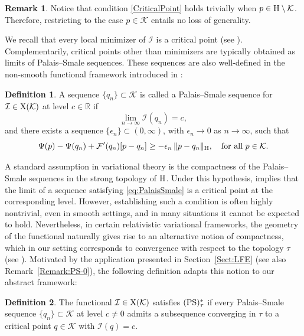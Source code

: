 \documentclass{article}
\newcommand{\boK}{\mathcal{K}}
\newcommand{\boI}{\mathcal{I}}
\newcommand{\R}{\mathbb{R}}
\newcommand{\boF}{\mathcal{F}}
\newcommand{\Hilb}{{\textnormal H}}
\newcommand{\X}{{\textnormal X}}
\newcommand{\PS}{(\textnormal{PS})^{*}_\tau}
\theoremstyle{definition}
\newtheorem{remark}{Remark}[section]
\newtheorem{definition}{Definition}[section]
\begin{document}
\begin{remark}
Notice that  condition \eqref{CriticalPoint} holds trivially when $p \in \Hilb \setminus \boK$. Therefore, restricting to the case $p \in \boK$ entails no loss of generality.
\end{remark}

We recall that every local minimizer of $\boI$ is a critical point (see \cite[Proposition 1.1]{Szu}). Complementarily, critical points other than minimizers are typically obtained as limits of Palais--Smale sequences. These sequences are also well-defined in the non-smooth functional framework introduced in \cite{Szu}:

\begin{definition}\label{def:PalaisSmale}
A sequence $\{q_n\} \subset \boK$ is called a Palais--Smale sequence for $\boI \in \X(\boK)$ at level $c \in \R$ if
\begin{equation}
    \lim_{n \to \infty} \mathcal{I}(q_n) = c,
\end{equation}
and there exists a sequence $\{\epsilon_n\} \subset (0,\infty)$, with $\epsilon_n \to 0$ as $n\to\infty$, such that
\begin{equation}\label{eq:PalaisSmale}
    \Psi(p) - \Psi(q_n) + \boF'(q_n)[p - q_n] \geq -\epsilon_n\,\|p - q_n\|_{\Hilb}, \quad \text{for all } p \in \boK.
\end{equation}
\end{definition}


A standard assumption in variational theory is the compactness of the Palais--Smale sequences in the strong topology of $\Hilb$. Under this hypothesis, \cite[Proposition 1.4]{Szu} implies that the limit of a sequence satisfying \eqref{eq:PalaisSmale} is a critical point at the corresponding level. However, establishing such a condition is often highly nontrivial, even in smooth settings, and in many situations it cannot be expected to hold. Nevertheless, in certain relativistic variational frameworks, the geometry of the functional naturally gives rise to an alternative notion of compactness, which in our setting corresponds to convergence with respect to the topology $\tau$ (see \cite{ABT,GLM}). Motivated by the application presented in Section~\ref{Sect:LFE} (see also Remark~\ref{Remark:PS-0}), the following definition adapts this notion to our abstract framework:

\begin{definition}\label{def:Funct-PS}
The functional $\boI \in \X(\boK)$ satisfies $\PS$ if every Palais--Smale sequence $\{q_n\} \subset \boK$ at level $c\neq0$ admits a subsequence converging in $\tau$ to a critical point $q \in \boK$ with $\boI(q)=c$.
\end{definition}
\end{document}
